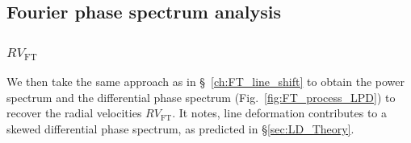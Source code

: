\subsection{Fourier phase spectrum analysis}

\subsubsection{$RV_\text{FT}$}
We then take the same approach as in  \S~\ref{ch:FT_line_shift} to obtain the power spectrum and the differential phase spectrum (Fig.~\ref{fig:FT_process_LPD}) to recover the radial velocities $RV_\text{FT}$. It notes, line deformation contributes to a skewed differential phase spectrum, as predicted in \S\ref{sec:LD_Theory}. 

